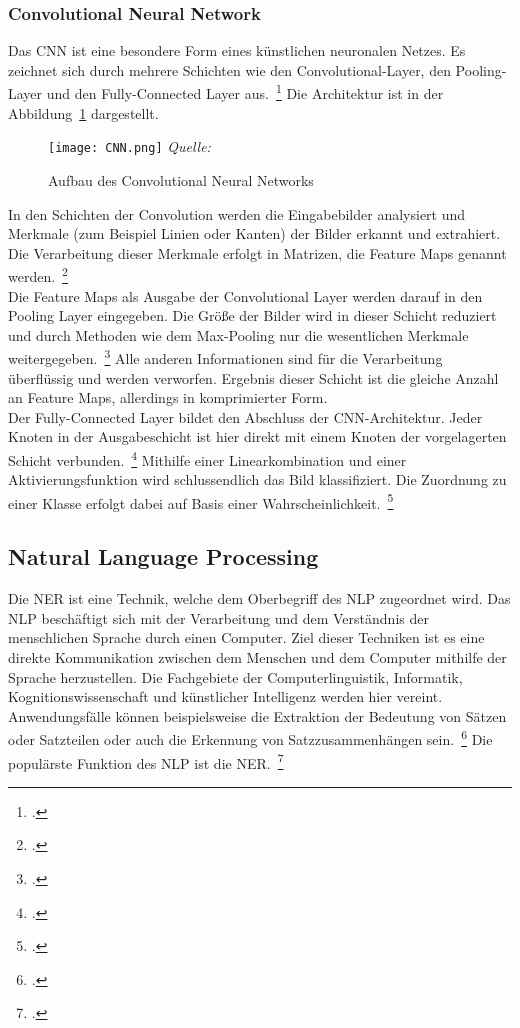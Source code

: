 \subsubsection{Convolutional Neural Network}
Das \ac{CNN} ist eine besondere Form eines künstlichen neuronalen Netzes. Es zeichnet sich durch mehrere Schichten wie den Convolutional-Layer, den Pooling-Layer und den Fully-Connected Layer aus.~\footcite[\vglf][]{internationalconferenceonadvancesinelectronics2018}
Die Architektur ist in der Abbildung~\ref{fig:CNN} dargestellt.
\\

\begin{figure}[H]
    \caption{Aufbau des Convolutional Neural Networks}\label{fig:CNN}
    \texttt{[image: CNN.png]}
    \textit{Quelle:~\cite[][]{alzubaidiReviewDeepLearning2021}}
\end{figure}

In den Schichten der Convolution werden die Eingabebilder analysiert und Merkmale (zum Beispiel Linien oder Kanten) der Bilder erkannt und extrahiert.
Die Verarbeitung dieser Merkmale erfolgt in Matrizen, die Feature Maps genannt werden.~\footcite[\vglf][ \& 328]{Goodfellow-2016} \\
Die Feature Maps als Ausgabe der Convolutional Layer werden darauf in den Pooling Layer eingegeben.
Die Größe der Bilder wird in dieser Schicht reduziert und durch Methoden wie dem Max-Pooling nur die wesentlichen Merkmale weitergegeben.~\footcite[\vglf][-339]{Goodfellow-2016}
Alle anderen Informationen sind für die Verarbeitung überflüssig und werden verworfen. Ergebnis dieser Schicht ist die gleiche Anzahl an Feature Maps, allerdings in komprimierter Form. \\
Der Fully-Connected Layer bildet den Abschluss der \ac{CNN}-Architektur. Jeder Knoten in der Ausgabeschicht ist hier direkt mit einem Knoten der vorgelagerten Schicht verbunden.~\footcite[\vglf][]{aggarwal2021}
Mithilfe einer Linearkombination und einer Aktivierungsfunktion wird schlussendlich das Bild klassifiziert. Die Zuordnung zu einer Klasse erfolgt dabei auf Basis einer Wahrscheinlichkeit.~\footcite[\vglf][]{tang2022}

\subsection{Natural Language Processing}
Die \acl{NER} ist eine Technik, welche dem Oberbegriff des \acl{NLP} zugeordnet wird. Das \ac{NLP} beschäftigt sich mit der Verarbeitung und dem Verständnis der menschlichen Sprache durch einen Computer.
Ziel dieser Techniken ist es eine direkte Kommunikation zwischen dem Menschen und dem Computer mithilfe der Sprache herzustellen. Die Fachgebiete der Computerlinguistik, Informatik, Kognitionswissenschaft und künstlicher Intelligenz werden hier vereint.
Anwendungsfälle können beispielsweise die Extraktion der Bedeutung von Sätzen oder Satzteilen oder auch die Erkennung von Satzzusammenhängen sein.~\footcite[\vglf][ \& 2]{deng2018} Die populärste Funktion des \ac{NLP} ist die \acf{NER}.~\footcite[\vglf][]{strobl2022}

